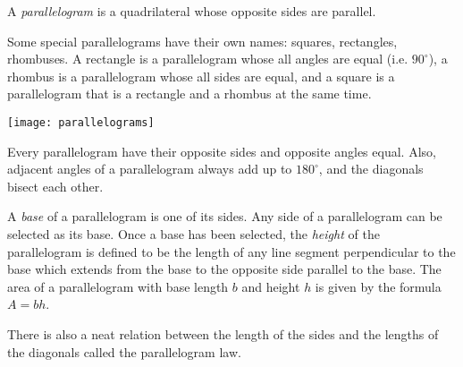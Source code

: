 \documentclass[12pt]{article}
\begin{document}
A {\em parallelogram} is a quadrilateral whose opposite sides are parallel.

Some special parallelograms have their own names: squares, rectangles, rhombuses.
A rectangle is a parallelogram whose all angles are equal (i.e. $90^\circ$), a rhombus is a parallelogram whose all sides are equal, and a square is a parallelogram that is a rectangle and a rhombus at the same time.

\texttt{[image: parallelograms]}

Every parallelogram have their opposite sides and opposite angles equal. Also, adjacent angles of a parallelogram always add up to $180^\circ$, and the diagonals bisect each other.

A \emph{base} of a parallelogram is one of its sides.  Any side of a
parallelogram can be selected as its base.  Once a base has been
selected, the \emph{height} of the parallelogram is defined to be the
length of any line segment perpendicular to the base which extends
from the base to the opposite side parallel to the base.  The area of
a parallelogram with base length $b$ and height $h$ is given by the
formula  \,$A = bh$.

There is also a neat relation between the length of the sides and the lengths of the diagonals called the parallelogram law.

\end{document}
